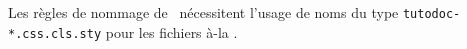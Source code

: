 \documentclass{tutodoc}
\begin{document}
\begin{tdoctech}
    \item Les règles de nommage de \ctan\ nécessitent l'usage de noms du type \verb+tutodoc-*.css.cls.sty+ pour les fichiers à-la .
\end{tdoctech}
\end{document}
